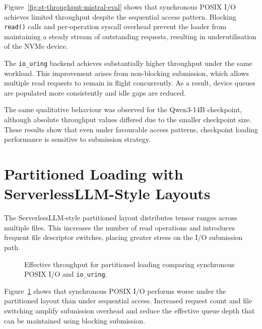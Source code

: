 \documentclass[]{final_report}
\begin{document}
Figure~\ref{fig:st-throughput-mistral-eval} shows that synchronous POSIX I/O achieves limited throughput despite the sequential access pattern. Blocking \texttt{read()} calls and per-operation syscall overhead prevent the loader from maintaining a steady stream of outstanding requests, resulting in underutilisation of the NVMe device.

The \texttt{io\_uring} backend achieves substantially higher throughput under the same workload. This improvement arises from non-blocking submission, which allows multiple read requests to remain in flight concurrently. As a result, device queues are populated more consistently and idle gaps are reduced.

The same qualitative behaviour was observed for the Qwen3-14B checkpoint, although absolute throughput values differed due to the smaller checkpoint size. These results show that even under favourable access patterns, checkpoint loading performance is sensitive to submission strategy.

\section{Partitioned Loading with ServerlessLLM-Style Layouts}

The ServerlessLLM-style partitioned layout distributes tensor ranges across multiple files. This increases the number of read operations and introduces frequent file descriptor switches, placing greater stress on the I/O submission path.

\begin{figure}[h]
\centering
{}
\caption{Effective throughput for partitioned loading comparing synchronous POSIX I/O and \texttt{io\_uring}.}
\label{fig:sllm-throughput-mistral-eval}
\end{figure}

Figure~\ref{fig:sllm-throughput-mistral-eval} shows that synchronous POSIX I/O performs worse under the partitioned layout than under sequential access. Increased request count and file switching amplify submission overhead and reduce the effective queue depth that can be maintained using blocking submission.
\end{document}
